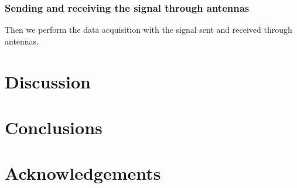 \documentclass[fleqn,usenatbib]{mnras}
\begin{document}
\subsubsection{Sending and receiving the signal through antennas}
Then we perform the data acquisition with the signal sent and received through antennas.



\section{Discussion}

\section{Conclusions}

\section*{Acknowledgements}








\bsp	%
\label{lastpage}
\end{document}

